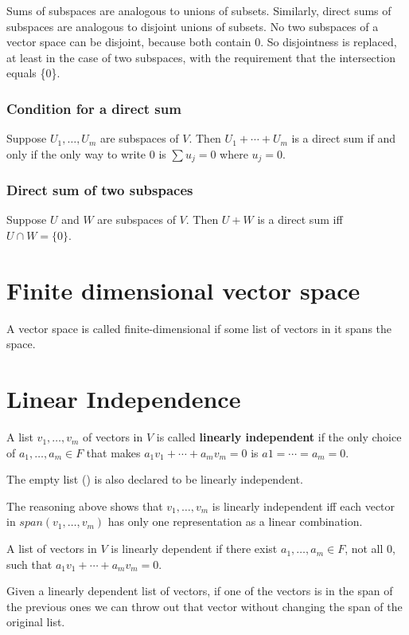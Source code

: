 Sums of subspaces are analogous to unions of subsets. Similarly, direct sums of subspaces are analogous to disjoint unions of subsets. No two subspaces of a vector space can be disjoint, because both contain 0. So  disjointness is replaced, at least in the case of two subspaces, with the requirement that the intersection equals \{0\}.

\subsubsection{Condition for a direct sum}
Suppose $U_1, \ldots, U_m$ are subspaces of $V$. Then  $U_1 + \cdots + U_m$ is a direct sum if and only if the only way to write $0$ is $\sum u_j = 0$ where $u_j = 0$.

\subsubsection{Direct sum of two subspaces}
Suppose $U$ and $W$ are subspaces of $V$. Then $U + W$ is a direct sum iff $U \cap  W = \{0\}$.

\section{Finite dimensional vector space}
A vector space is called finite-dimensional if some list of vectors in it spans the space.

\section{Linear Independence}
\begin{definition}
  A list $v_1, \ldots, v_m$ of vectors in $V$ is called \textbf{linearly independent} if the only choice of $a_1, \ldots, a_m \in F$ that makes $a_1v_1 +\cdots+a_mv_m=0$ is $a 1 = \cdots = a_m = 0$.
\end{definition}


The empty list () is also declared to be linearly independent.

The reasoning above shows that $v_1, \ldots, v_m$ is linearly independent iff each vector in $span(v_1,\ldots,v_m)$ has only one representation as a linear combination.

\begin{definition}
  A list of vectors in $V$ is linearly dependent if there exist $a_1, \ldots, a_m \in F$, not all 0, such that $a_1v_1 +\cdots+a_mv_m=0$.
\end{definition}
Given a linearly dependent list of vectors, if one of the vectors is in the span of the previous ones we can throw out that vector without changing the span of the original list.

